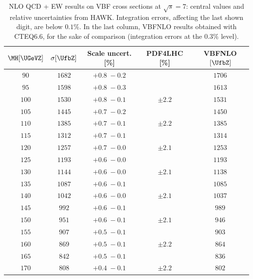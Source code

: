 \begin{table}[h!]
  \caption{NLO QCD + EW results on VBF cross sections at $\sqrt{s} = 7$\UTeV: central values  and relative uncertainties  from {\sc HAWK}. Integration errors,
  affecting the last shown digit, are below $0.1\%$. In the last column, {\sc
    VBFNLO} results obtained with CTEQ6.6, for the sake of comparison
  (integration errors at the $0.3\%$ level).}
  \centering
  \small
  \begin{tabular}{ccccc}\hline
$\MH [\UGeVZ]$ & $\sigma[\UfbZ]$ & Scale uncert. [\%] & PDF4LHC [\%] &  {\sc VBFNLO} $[\UfbZ]$ \\  
\hline
$90  $&$ 1682  $&$ +0.8 \; -\!0.2 $&$          $&$ 1706  $ \\
$95  $&$ 1598  $&$ +0.8 \; -\!0.3 $&$          $&$ 1613  $ \\
$100 $&$ 1530  $&$ +0.8 \; -\!0.1 $&$ \pm 2.2  $&$ 1531  $ \\
$105 $&$ 1445  $&$ +0.7 \; -\!0.2 $&$          $&$ 1450  $ \\
$110 $&$ 1385  $&$ +0.7 \; -\!0.1 $&$ \pm 2.2  $&$ 1385  $ \\
$115 $&$ 1312  $&$ +0.7 \; -\!0.1 $&$          $&$ 1314  $ \\
$120 $&$ 1257  $&$ +0.7 \; -\!0.0 $&$ \pm 2.1  $&$ 1253  $ \\
$125 $&$ 1193  $&$ +0.6 \; -\!0.0 $&$          $&$ 1193  $ \\
$130 $&$ 1144  $&$ +0.6 \; -\!0.0 $&$ \pm 2.1  $&$ 1138  $ \\
$135 $&$ 1087  $&$ +0.6 \; -\!0.1 $&$          $&$ 1085  $ \\
$140 $&$ 1042  $&$ +0.6 \; -\!0.0 $&$ \pm 2.1  $&$ 1037  $ \\
$145 $&$  992  $&$ +0.6 \; -\!0.1 $&$          $&$ 989 $ \\
$150 $&$  951  $&$ +0.6 \; -\!0.1 $&$ \pm 2.1  $&$ 946 $ \\
$155 $&$  907  $&$ +0.5 \; -\!0.1 $&$          $&$ 903 $ \\
$160 $&$  869  $&$ +0.5 \; -\!0.1 $&$ \pm 2.2  $&$ 864 $ \\
$165 $&$  842  $&$ +0.5 \; -\!0.1 $&$          $&$ 836 $ \\
$170 $&$  808  $&$ +0.4 \; -\!0.1 $&$ \pm 2.2  $&$ 802 $ \\

\end{tabular}
\end{table}
